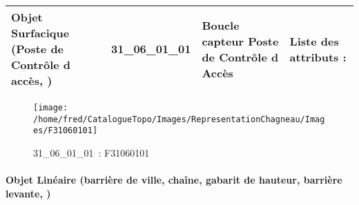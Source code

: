 \documentclass[12pt,titlepage,oneside]{book}
\begin{document}
\renewcommand{\arraystretch}{1.2}
\begin{supertabular}{|p{10cm}|c|p{13cm}|p{12cm}|}
 Objet Surfacique (Poste de Contrôle d accès,  ) & 31\_06\_01\_01 & Boucle capteur Poste de Contrôle d Accès & Liste des attributs :
\begin{enumerate}
\end{enumerate}
\\
\hline
\end{supertabular}
\begin{figure}[h!]
  \hfill         %
  \begin{minipage}[t]{3cm}
    \begin{center}
      \texttt{[image: /home/fred/CatalogueTopo/Images/RepresentationChagneau/Images/F31060101]}
      \caption[~31\_06\_01\_01]{\small{31\_06\_01\_01~:} \tiny{F31060101}}\label{F31060101}
    \end{center}
  \end{minipage}
\end{figure}


\paragraph{Objet Linéaire (barrière de ville, chaîne, gabarit de hauteur, barrière levante,  )}
\noindent
\vspace{\baselineskip}
\end{document}

